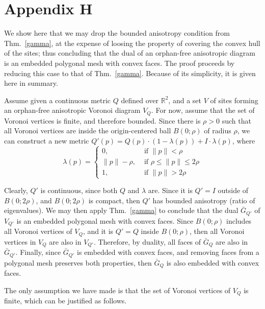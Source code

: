 \documentclass[11pt]{article}
\begin{document}
\section*{Appendix H}\label{app:noanisotropy}

We show here that we may drop the bounded anisotropy condition from Thm.~\ref{gamma}, at the expense of loosing the property of covering the convex hull of the sites; 
thus concluding that the dual of an orphan-free anisotropic diagram is an embedded polygonal mesh with convex faces. The proof proceeds by reducing this case to that of Thm.~\ref{gamma}. Because of its simplicity, it is given here in summary. 

Assume given a continuous metric $Q$ defined over $\mathbb{R}^2$, and a set $V$ of sites forming an orphan-free anisotropic Voronoi diagram $V_Q$.
For now, assume that the set of Voronoi vertices is finite, and therefore bounded. 
Since there is $\rho > 0$ such that all Voronoi vertices are inside the origin-centered ball $B(0;\rho)$ of radius $\rho$, we can construct a new metric 
$Q'(p) = Q(p)\cdot(1-\lambda(p)) + I\cdot\lambda(p)$, where 
\[ \lambda(p) = \begin{cases}0,&\text{ if } \|p\| < \rho\\ \|p\|-\rho ,&\text{ if }\rho\le\|p\|\le 2\rho\\ 1 ,&\text{ if }\|p\| > 2\rho\end{cases} \]

Clearly, $Q'$ is continuous, since both $Q$ and $\lambda$ are. Since it is $Q'=I$ outside of $B(0;2\rho)$, and $B(0;2\rho)$ is compact, then 
$Q'$ has bounded anisotropy (ratio of eigenvalues). 
We may then apply Thm.~\ref{gamma} to conclude that the dual $\bar{G}_{Q'}$ of $V_{Q'}$ is an embedded polygonal mesh with convex faces. 
Since $B(0;\rho)$ includes all Voronoi vertices of $V_Q$, and it is $Q'=Q$ inside $B(0;\rho)$, then all Voronoi vertices in $V_Q$ are also in $V_{Q'}$. 
Therefore, by duality, all faces of $\bar{G}_{Q}$ are also in $\bar{G}_{Q'}$. Finally, since $\bar{G}_{Q'}$ is embedded with convex faces, 
and removing faces from a polygonal mesh preserves both properties, then $\bar{G}_{Q}$ is also embedded with convex faces. 

The only assumption we have made is that the set of Voronoi vertices of $V_Q$ is finite,  which can be justified as follows. 
\end{document}
